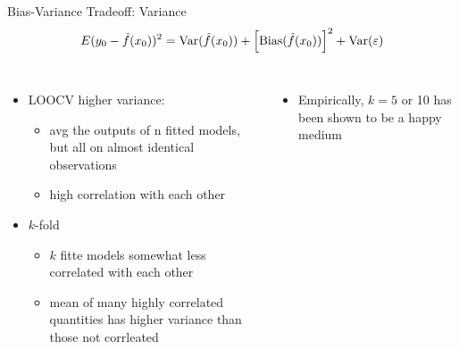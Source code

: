 \documentclass[aspectratio=169,usenames,dvipsnames]{beamer}
\newcommand{\InstructorList}[1]{
\begin{itemize}
	\color{orange}
	#1
\end{itemize}
}
\begin{document}
\begin{frame}[t]{Bias-Variance Tradeoff: Variance}
	\begin{equation*}
		E(y_0 - \hat f (x_0))^2 = \mathrm{Var}(\hat f (x_0))
			+ \left[\mathrm{Bias}(\hat f(x_0)) \right] ^2
			+ \mathrm{Var}(\varepsilon)
	\end{equation*}
\begin{columns}
\centering

\InstructorList{
\item LOOCV higher variance:
\InstructorList{
	\item avg the outputs of n fitted models, but all on almost identical observations
	\item high correlation with each other
}
\item $k$-fold
\InstructorList{
\item $k$ fitte models somewhat less correlated with each other
\item mean of many highly correlated quantities has higher variance than those not corrleated
}
}

\centering
\InstructorList{
\item Empirically, $k=5$ or 10 has been shown to be a happy medium
}
\end{columns}

\end{frame}

\end{document}
